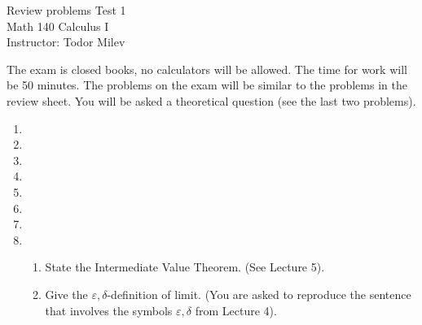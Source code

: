 \documentclass{article}
\begin{document}
\begin{center}
\Large
Review problems Test 1\\ Math 140 Calculus I \\ \normalsize Instructor: Todor Milev
\end{center}


\noindent The exam is closed books, no calculators will be allowed. The time for work will be 50 minutes. The problems on the exam will be similar to the problems in the review sheet. You will be asked a theoretical question (see the last two problems).

\begin{enumerate}
\item 
\item 
\item 
\item 

\item 
\item 
\item 
\item
\begin{enumerate}
\item State the Intermediate Value Theorem. (See Lecture 5).
\item Give the $\varepsilon,\delta$-definition of limit. (You are asked to reproduce the sentence that involves the symbols $\varepsilon,\delta$ from Lecture 4).
\end{enumerate}
\end{enumerate}
\end{document}
